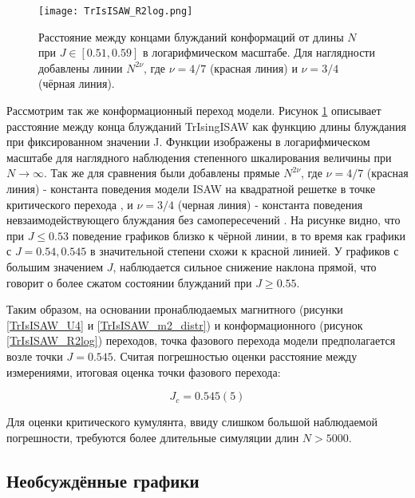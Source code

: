 \begin{figure}[h]
\centering
\texttt{[image: TrIsISAW\_R2log.png]}
\caption{Расстояние между концами блужданий конформаций от длины $N$ при $J \in [0.51,0.59]$ в логарифмическом масштабе. 
Для наглядности добавлены линии $N^{2\nu}$, где $\nu = 4/7$ (красная линия) и $\nu=3/4$ (чёрная линия).}
\label{fig:TrIsISAW_R2log}
\end{figure}

Рассмотрим так же конформационный переход модели.
Рисунок \ref{fig:TrIsISAW_R2log} описывает расстояние между конца блужданий TrIsingISAW как функцию длины блуждания при фиксированном значении J.
Функции изображены в логарифмическом масштабе для наглядного наблюдения степенного шкалирования величины при $N \to \infty$.
Так же для сравнения были добавлены прямые $N^{2\nu}$, где $\nu = 4/7$ (красная линия) - константа поведения модели ISAW на квадратной решетке в точке критического перехода \cite{Duplantier1987},
и $\nu = 3/4$ (черная линия) - константа поведения невзаимодействующего блуждания без самопересечений \cite{Rensburg2015}.
На рисунке видно, что при $J \leq 0.53$ поведение графиков близко к чёрной линии, в то время как графики с $J = 0.54, 0.545$ в значительной степени схожи к красной линией.
У графиков с большим значением $J$, наблюдается сильное снижение наклона прямой, что говорит о более сжатом состоянии блужданий при $J \geq 0.55$.   

Таким образом, на основании пронаблюдаемых магнитного (рисунки \ref{TrIsISAW_U4} и \ref{TrIsISAW_m2_distr}) и конформационного (рисунок \ref{TrIsISAW_R2log}) переходов,
точка фазового перехода модели предполагается возле точки $J=0.545$. Считая погрешностью оценки расстояние между измерениями, итоговая оценка точки фазового перехода:

\begin{equation}
\label{eq:TrIsISAW_Jc}
	J_c = 0.545(5)
\end{equation}

Для оценки критического кумулянта, ввиду слишком большой наблюдаемой погрешности, требуются более длительные симуляции длин $N > 5000$.

\newpage

\subsection{Необсуждённые графики}

